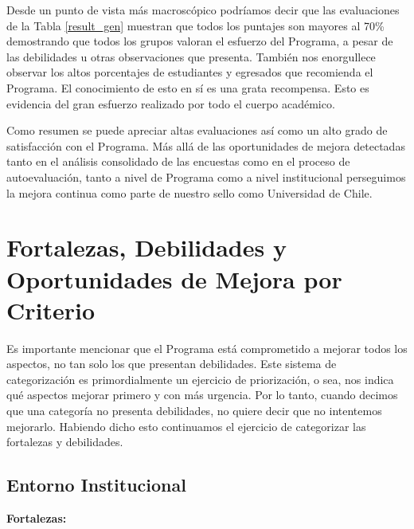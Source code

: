 Desde un punto de vista más macroscópico podríamos decir que las evaluaciones de la Tabla \ref{result_gen} muestran que todos 
los puntajes son mayores al 70\% demostrando que todos los grupos valoran el esfuerzo del Programa, a pesar de las debilidades u otras 
observaciones que presenta. También nos enorgullece observar los altos porcentajes de estudiantes y egresados que recomienda el Programa. 
El conocimiento de esto en sí es una grata recompensa. Esto es evidencia del gran esfuerzo realizado por todo el cuerpo académico.  

Como resumen se puede apreciar altas evaluaciones así como un alto grado de satisfacción con el Programa. Más
allá de las oportunidades de mejora detectadas tanto en el análisis consolidado de las encuestas como en el proceso de
autoevaluación, tanto a nivel de Programa como a nivel institucional perseguimos la mejora continua como parte de
nuestro sello como Universidad de Chile.


\section{Fortalezas, Debilidades y Oportunidades de Mejora por Criterio}

Es importante mencionar que el Programa está comprometido a mejorar todos los aspectos, no tan solo los que presentan debilidades.
Este sistema de categorización es primordialmente un ejercicio de priorización, o sea, nos indica qué aspectos mejorar primero y 
con más urgencia. Por lo tanto, cuando decimos que una categoría no presenta debilidades, no quiere decir que no intentemos 
mejorarlo. Habiendo dicho esto continuamos el ejercicio de categorizar las fortalezas y debilidades.

\subsection{Entorno Institucional}

\noindent\textbf{Fortalezas:}

